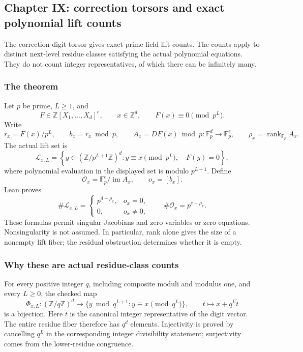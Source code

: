 \hypertarget{cont2:paper-ix-correction-torsors-and-exact-polynomial-lift-counts}{%
\subsection{Chapter IX: correction torsors and exact polynomial lift
counts}\label{cont2:paper-ix-correction-torsors-and-exact-polynomial-lift-counts}}

The correction-digit torsor gives exact prime-field lift counts. The counts apply to distinct next-level
residue classes satisfying the actual polynomial equations. They do not
count integer representatives, of which there can be infinitely many.

\hypertarget{cont2:the-theorem}{%
\subsubsection{The theorem}\label{cont2:the-theorem}}

Let \(p\) be prime, \(L\ge1\), and \[
F\in\mathbb Z[X_1,\ldots,X_d]^e,
\qquad x\in\mathbb Z^d,
\qquad F(x)\equiv0\pmod{p^L}.
\] Write \[
r_x=F(x)/p^L,\qquad b_x=r_x\bmod p,
\qquad A_x=DF(x)\bmod p:\mathbb F_p^d\longrightarrow\mathbb F_p^e,
\qquad \rho_x=\operatorname{rank}_{\mathbb F_p}A_x.
\] The actual lift set is \[
\mathcal L_{x,L}=
\left\{y\in(\mathbb Z/p^{L+1}\mathbb Z)^d:
 y\equiv x\pmod{p^L},\quad F(y)=0\right\},
\] where polynomial evaluation in the displayed set is modulo
\(p^{L+1}\). Define \[
\mathcal O_x=\mathbb F_p^e/\operatorname{im}A_x,
\qquad o_x=[b_x].
\] Lean proves \[
\boxed{
\#\mathcal L_{x,L}=
\begin{cases}
p^{d-\rho_x},&o_x=0,\\
0,&o_x\ne0,
\end{cases}
\qquad
\#\mathcal O_x=p^{e-\rho_x}.
}
\] These formulas permit singular Jacobians and zero variables or zero
equations. Nonsingularity is not assumed. In particular, rank alone
gives the size of a nonempty lift fiber; the residual obstruction
determines whether it is empty.

\hypertarget{cont2:why-these-are-actual-residue-class-counts}{%
\subsubsection{Why these are actual residue-class
counts}\label{cont2:why-these-are-actual-residue-class-counts}}

For every positive integer \(q\), including composite moduli and modulus
one, and every \(L\ge0\), the checked map \[
\Phi_{x,L}:(\mathbb Z/q\mathbb Z)^d\longrightarrow
\{y\bmod q^{L+1}:y\equiv x\pmod{q^L}\},
\qquad t\longmapsto x+q^L\widetilde t
\] is a bijection. Here \(\widetilde t\) is the canonical integer
representative of the digit vector. The entire residue fiber therefore
has \(q^d\) elements. Injectivity is proved by cancelling \(q^L\) in the
corresponding integer divisibility statement; surjectivity comes from
the lower-residue congruence.

